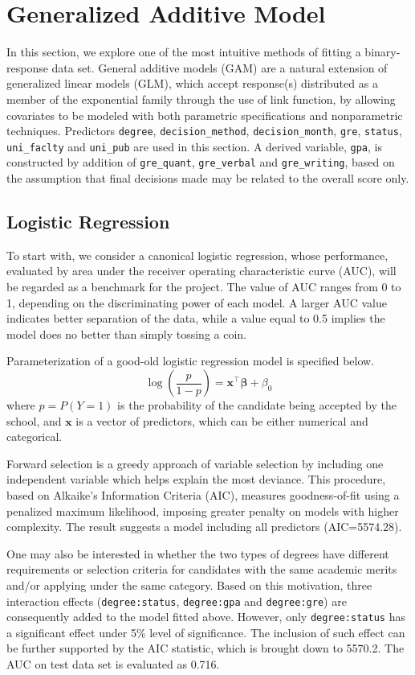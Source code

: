 \section{Generalized Additive Model}
In this section, we explore one of the most intuitive methods of fitting a binary-response data set. General additive models (GAM) are a natural extension of generalized linear models (GLM), which accept response(s) distributed as a member of the exponential family through the use of link function, by allowing covariates to be modeled with both parametric specifications and nonparametric techniques. Predictors \texttt{degree}, \texttt{decision_method}, \texttt{decision_month}, \texttt{gre}, \texttt{status}, \texttt{uni_faclty} and \texttt{uni_pub} are used in this section. A derived variable, \texttt{gpa}, is constructed by addition of \texttt{gre_quant}, \texttt{gre_verbal} and \texttt{gre_writing}, based on the assumption that final decisions made may be related to the overall score only.
\subsection{Logistic Regression}
To start with, we consider a canonical logistic regression, whose performance, evaluated by area under the receiver operating characteristic curve (AUC), will be regarded as a benchmark for the project. The value of AUC ranges from 0 to 1, depending on the discriminating power of each model. A larger AUC value indicates better separation of the data, while a value equal to 0.5 implies the model does no better than simply tossing a coin.
\par Parameterization of a good-old logistic regression model is specified below.
\[
\log\left(\frac{p}{1-p}\right)=\mathbf{x}^\top\boldsymbol{\beta}+\beta_0
\]
where $p=P(Y=1)$ is the probability of the candidate being accepted by the school, and $\mathbf{x}$ is a vector of predictors, which can be either numerical and categorical. 
\par Forward selection is a greedy approach of variable selection by including one independent variable which helps explain the most deviance. This procedure, based on Alkaike's Information Criteria (AIC), measures goodness-of-fit using a penalized maximum likelihood, imposing greater penalty on models with higher complexity. The result suggests a model including all predictors (AIC=5574.28).
\par One may also be interested in whether the two types of degrees have different requirements or selection criteria for candidates with the same academic merits and/or applying under the same category. Based on this motivation, three interaction effects (\texttt{degree:status}, \texttt{degree:gpa} and \texttt{degree:gre}) are consequently added to the model fitted above. However, only \texttt{degree:status} has a significant effect under 5\% level of significance. The inclusion of such effect can be further supported by the AIC statistic, which is brought down to 5570.2. The AUC on test data set is evaluated as 0.716.

